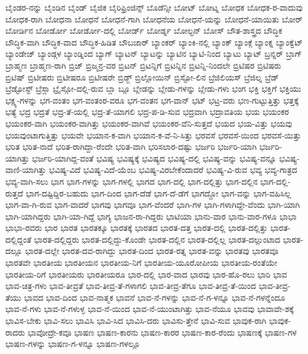 {ಬೈಂಡರ-ನನ್ನು
ಬೈಂಡಿನ
ಬೈಂಡ್
ಬೈಜಿಕ
ಬೈರಿಫ್ರಿಂಜಿನ್ಸ್
ಬೊಡೆನ್ಸೀ
ಬೋಟ್
ಬೋಟ್ನ
ಬೋಧಕ
ಬೋಧಕ-ರ-ವಾದುವು
ಬೋಧಕ-ರಾಗಿ
ಬೋಧನಾ
ಬೋಧನೆ
ಬೋಧನೆ-ಗಾಗಿ
ಬೋಧನೆಯ
ಬೋಧನೆ-ಯನ್ನು
ಬೋಧನೆ-ಯಾಯಿತು
ಬೋರ್
ಬೋರ್ಡಿನ
ಬೋರ್ಡೋ
ಬೋರ್ಡೋ-ದಲ್ಲಿ
ಬೋರ್ಡ್
ಬೋರ್ಡ್ನ
ಬೋಲ್ಟನ್
ಬೋಸ್
ಬೌತ-ಶಾಸ್ತ್ರದ
ಬೌದ್ಧಿಕ
ಬೌದ್ಧಿಕ-ವಾಗಿ
ಬೌದ್ಧಿಕ-ವಾದ
ಬೌದ್ಧಿಕ-ಹಿಡಿತ
ಬೌಬಜಾರ್
ಬ್ಯಾಂಕರ್
ಬ್ಯಾಂಕಿ-ನಲ್ಲಿ
ಬ್ಯಾಂಕ್
ಬ್ಯಾಂಕ್ಗೆ
ಬ್ಯಾಂಕ್ನ
ಬ್ಯಾಂಕ್ವೆಟ್
ಬ್ಯಾಂಡೇಜ್
ಬ್ಯಾಂಡ್ಗಳ
ಬ್ಯಾಂಡ್ನಿಂದ
ಬ್ಯಾಗ್
ಬ್ಯಾಟನ್
ಬ್ಯಾಟನ್ನು
ಬ್ಯಾಟಿನ
ಬ್ಯಾಟಿ-ನಿಂದ
ಬ್ಯಾಟು
ಬ್ಯಾಟ್
ಬ್ರನ್ನರ್
ಬ್ರಾಗ್
ಬ್ರಾಹ್ಮಣ
ಬ್ರಾಹ್ಮಣ-ರಾಗಿ
ಬ್ರಿಜ್
ಬ್ರಿಜ್ಮನ್ರ-ವರ
ಬ್ರಿಟನ್
ಬ್ರಿಟನ್ನಿಗೆ
ಬ್ರಿಟನ್ನಿನ
ಬ್ರಿಟನ್ನಿ-ನಿಂದಲೇ
ಬ್ರಿಟಿಷರ
ಬ್ರಿಟಿಷರು
ಬ್ರಿಟಿಷ್
ಬ್ರಿಟೀಷರು
ಬ್ರಿಟೀಷರೂ
ಬ್ರಿಟೀಷರೇ
ಬ್ರಿಡ್ಜ್
ಬ್ರಿಲ್ಲೋಯಿನ್
ಬ್ರಿಸ್ಟೋ-ಲಿನ
ಬ್ರೆಜಿಲಿಯಸ್
ಬ್ರೆಜಿಲ್ನ
ಬ್ರೆಡ್
ಬ್ರೆಡ್ಟೋಸ್ಟ್
ಬ್ರೆಸ್ಲಾ
ಬ್ರೈಸ್ಗೋ-ದಲ್ಲಿ-ರುವ
ಬ್ಲಾ
ಬ್ಲೂ
ಬ್ಲೇಡನ್ನು
ಬ್ಲೇಡು-ಗಳನ್ನು
ಬ್ಲೇಡು-ಗಳು
ಭಂಗ
ಭಕ್ತಿ
ಭಕ್ತಿಗೆ
ಭಕ್ತಿಯು
ಭಕ್ಷ್ಯ-ಗಳನ್ನು
ಭಗ-ವಂತಂ
ಭಗ-ವಂತಂರ-ವರೂ
ಭಗ-ವಂತನ
ಭಗ-ವಾನ್
ಭಟ್
ಭಟ್ರ-ವರು
ಭಣ-ಗುಟ್ಟುತ್ತಿತ್ತು
ಭತ್ತಕ್ಕೆ
ಭತ್ಯೆ
ಭದ್ರ
ಭದ್ರತೆ
ಭದ್ರ-ತೆ-ಯಲ್ಲಿ
ಭದ್ರ-ತೆ-ಯಾಗಲಿ
ಭದ್ರ-ಪ-ಡಿ-ಸುವ
ಭದ್ರವಾಗಿ
ಭದ್ರಾವತಿಯ
ಭಯ
ಭಯಂಕರ
ಭಯಂಕರ-ವಾಗಿ
ಭಯಂಕರ-ವಾಗಿತ್ತು
ಭಯಂಕರ-ವಾಗಿವೆ
ಭಯಂಕರ-ವೆನಿ-ಸುತ್ತದೆ
ಭಯದ
ಭಯ-ವಿತ್ತು
ಭಯವು
ಭಯವುಂಟಾಗುತ್ತಿತ್ತು
ಭಯವೇ
ಭಯಾನ-ಕ-ವಾಗಿ
ಭಯಾನ-ಕ-ವೆ-ನಿ-ಸಿತ್ತು
ಭರವಸೆ
ಭರವಸೆ-ಯಿಂದ
ಭರವಸೆ-ಯಿತ್ತು
ಭರಿತ
ಭರಿತ-ನಾದೆ
ಭರಿತ-ರಾಗಿದ್ದಾ-ರೆಂದೇ
ಭರಿತ-ವಾಗಿ
ಭರಿಸಲಾರ-ದಷ್ಟು
ಭರ್ಜರಿ
ಭರ್ಜರಿ-ಯಾಗಿ
ಭರ್ಜರಿ-ಯಾಗಿತ್ತು
ಭರ್ಜರಿ-ಯಾಗಿದ್ದ-ವಂತೆ
ಭವಿಷ್ಯ
ಭವಿಷ್ಯಕ್ಕೆ
ಭವಿಷ್ಯದ
ಭವಿಷ್ಯ-ದಲ್ಲಿ
ಭವಿಷ್ಯ-ವನ್ನು
ಭವಿಷ್ಯ-ವನ್ನೂ
ಭವಿಷ್ಯ-ವಾಣಿ-ಯಾಗಿತ್ತು
ಭವಿಷ್ಯ-ವಿದೆ
ಭವಿಷ್ಯ-ವಿದೆ-ಯೆಂಬ
ಭವಿಷ್ಯ-ವಿರಬೇಕೆಂದಾದರೆ
ಭವಿಷ್ಯ-ವಿ-ರುವ
ಭವ್ಯ
ಭವ್ಯ-ಗಾತ್ರದ
ಭವ್ಯ-ವಾಗಿ-ಸಲು
ಭಾಗ
ಭಾಗ-ಗಳನ್ನು
ಭಾಗ-ಗಳಲ್ಲಿ
ಭಾಗದ
ಭಾಗ-ದಲ್ಲಿ
ಭಾಗ-ದಲ್ಲಿತ್ತು
ಭಾಗ-ದಲ್ಲಿನ
ಭಾಗ-ದಲ್ಲಿ-ರುತ್ತದೆ
ಭಾಗ-ದಷ್ಟಿದ್ದಿರ-ಬಹುದು
ಭಾಗ-ದಿಂದ
ಭಾಗ-ದೆಡೆ
ಭಾಗ-ದೆ-ಡೆಗೆ
ಭಾಗದ್ದೋ
ಭಾಗ-ವನ್ನು
ಭಾಗ-ವಹಿಸಿಲ್ಲ
ಭಾಗ-ವಾ-ಗಿ-ರುವ
ಭಾಗ-ವಾದರೆ
ಭಾಗವು
ಭಾಗವೂ
ಭಾಗ-ವೆಂದರೆ
ಭಾಗಿ-ಗಳ
ಭಾಗಿ-ಗಳಾಗಿದ್ದೇ-ವೆಂದು
ಭಾಗಿ-ಯಾಗಿ
ಭಾಗಿ-ಯಾಗಿದ್ದರು
ಭಾಗಿ-ಯಾ-ಗಿದ್ದೆ
ಭಾಗ್ಯ
ಭಾಜನ-ರಾ-ಗಿದ್ದರು
ಭಾಟಿಯಾ
ಭಾನು-ವಾರ
ಭಾನು-ವಾರ-ಗಳೂ
ಭಾಭಾ
ಭಾಭಾ-ರವರು
ಭಾರ
ಭಾರತ
ಭಾರತಕ್ಕೂ
ಭಾರತಕ್ಕೆ
ಭಾರತದ
ಭಾರತ-ದತ್ತ
ಭಾರತ-ದಲ್ಲಿ
ಭಾರತ-ದಲ್ಲಿತ್ತು
ಭಾರತ-ದಲ್ಲಿದ್ದಂತೆ
ಭಾರತ-ದಲ್ಲಿದ್ದರು
ಭಾರತ-ದಲ್ಲಿದ್ದು-ಕೊಂಡೇ
ಭಾರತ-ದಲ್ಲಿನ
ಭಾರತ-ದಲ್ಲಿಲ್ಲ
ಭಾರತ-ದಲ್ಲುಂಟಾದ
ಭಾರತ-ದಲ್ಲೂ
ಭಾರತ-ದಲ್ಲೇ
ಭಾರತ-ದವ-ರಾಗಿದ್ದು
ಭಾರತ-ದಿಂದ
ಭಾರತ-ರತ್ನ
ಭಾರತ-ವನ್ನು
ಭಾರತವು
ಭಾರತವೂ
ಭಾರತವೇ
ಭಾರತೀಯ
ಭಾರತೀಯನ
ಭಾರತೀಯ-ನಿಗೆ
ಭಾರತೀಯ-ಯೂರೋಪೀಯ
ಭಾರತೀಯ-ರಂತೆಯೇ
ಭಾರತೀಯ-ರಿಗೆ
ಭಾರತೀಯರು
ಭಾರತೀಯರೂ
ಭಾರ-ದಲ್ಲಿ
ಭಾರ-ವಾದ
ಭಾರವು
ಭಾರ-ಹೊ-ರಲು
ಭಾರಿ
ಭಾವ
ಭಾವ-ಚಿತ್ರ-ಗಳು
ಭಾವ-ತೀವ್ರತೆ
ಭಾವ-ತೀವ್ರ-ತೆ-ಗಳಾಗಲಿ
ಭಾವ-ತೀವ್ರ-ತೆಗೂ
ಭಾವ-ತೀವ್ರ-ತೆ-ಯಿಂದ
ಭಾವ-ತೀವ್ರ-ತೆಯು
ಭಾವದ
ಭಾವ-ದಿಂದ
ಭಾವ-ನಾತ್ಮಕ
ಭಾವನೆ
ಭಾವ-ನೆ-ಗಳನ್ನು
ಭಾವ-ನೆ-ಗ-ಳನ್ನೂ
ಭಾವ-ನೆ-ಗಳನ್ನೆಂದೂ
ಭಾವ-ನೆ-ಗಳು
ಭಾವ-ನೆ-ಗಳುಳ್ಳ
ಭಾವ-ನೆ-ಯಿಂದ
ಭಾವ-ನೆ-ಯುಂಟಾಗಿತ್ತು
ಭಾವ-ನೆಯೂ
ಭಾವವು
ಭಾವಾವೇ-ಶಕ್ಕೆ
ಭಾವಿಸ-ಬೇಕು
ಭಾವಿ-ಸಲು
ಭಾವಿಸಿ
ಭಾವಿ-ಸಿದ
ಭಾವಿಸಿ-ದರು
ಭಾವಿಸು-ತ್ತೇನೆ
ಭಾವಿ-ಸುವ
ಭಾವುಕ-ರಾಗಿ
ಭಾವುಕ-ರಾದರು
ಭಾವೋದ್ರೇ-ಕವೂ
ಭಾಷಣ
ಭಾಷಣ-ಕಾರನು
ಭಾಷಣ-ಕಾರರ
ಭಾಷಣ-ಕಾರ-ರೆಂದು
ಭಾಷಣಕ್ಕೆ
ಭಾಷಣ-ಗಳ
ಭಾಷಣ-ಗಳನ್ನು
ಭಾಷಣ-ಗ-ಳನ್ನೂ
ಭಾಷಣ-ಗಳಲ್ಲೂ
}

